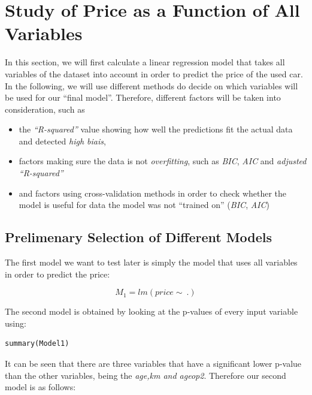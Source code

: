 \section{Study of Price as a Function of All Variables} %
\label{sec:study_of_price_as_a_function_of_all_variables}

In this section, we will first calculate a linear regression model 
that takes all variables of the dataset into account in order to
predict the price of the used car. In the following, we will use different 
methods do decide on which variables will be used for our ``final model''. 
Therefore, different factors will be taken into consideration, such as

\begin{itemize}
	\item the \emph{``R-squared''} value showing how well the predictions fit the actual data and detected \emph{high biais},
	\item factors making sure the data is not \emph{overfitting}, such as 
	\emph{BIC}, \emph{AIC} and \emph{adjusted ``R-squared''}
	\item and factors using cross-validation methods in order to check 
	whether the model is useful for data the model was not ``trained on'' 
	(\emph{BIC}, \emph{AIC})
\end{itemize}

\subsection{Prelimenary Selection of Different Models} %
\label{sub:prelimenary_selection_of_different_models}

The first model we want to test later is simply the model that uses all 
variables in order to predict the price: 

\begin{equation}\label{eq:model1}
	M_1 = lm(price \sim\ .)
\end{equation}

The second model is obtained by looking at the p-values of every input 
variable using:

\begin{lstlisting}[caption={summary() in R},label={lst:summary_func}]
	summary(Model1)
\end{lstlisting}

It can be seen that there are three variables that have a significant lower 
p-value than the other variables, being the \emph{age,km and ageop2}.
Therefore our second model is as follows:

